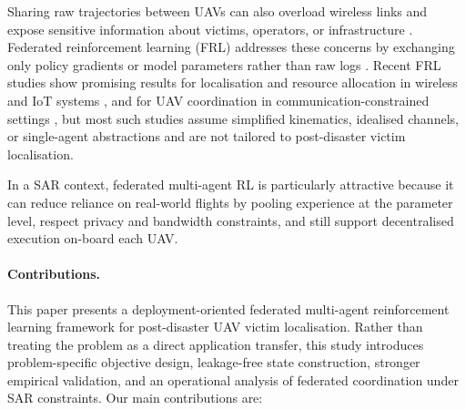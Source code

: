 \documentclass[drones,article,accept,pdftex,moreauthors]{Definitions/mdpi}
\begin{document}
Sharing raw trajectories between UAVs can also overload wireless links and expose sensitive information about victims, operators, or infrastructure
\citep{lamaaziMobileEdgeBasedCrowdSensing2020}.
Federated reinforcement learning (FRL) addresses these concerns by exchanging only policy gradients or model parameters rather than raw logs
\citep{shahbaziAgentBasedRecommendationELearning2022,wuTaskAllocationLoad2022,pintoNetoFRLIoT2023,qiFRLSurvey2022}.
Recent FRL studies show promising results for localisation and resource allocation in wireless and IoT systems
\citep{pintoNetoFRLIoT2023,ebrahimiAutonomousUAVTrajectory2020},
and for UAV coordination in communication-constrained settings
\citep{chenModelAidedFederatedReinforcement2023},
but most such studies assume simplified kinematics, idealised channels, or single-agent abstractions and are not tailored to post-disaster victim localisation.

In a SAR context, federated multi-agent RL is particularly attractive because it can reduce reliance on real-world flights by pooling experience at the parameter level, respect privacy and bandwidth constraints, and still support decentralised execution on-board each UAV.

\paragraph{Contributions.}
This paper presents a deployment-oriented federated multi-agent reinforcement learning framework for post-disaster UAV victim localisation. Rather than treating the problem as a direct application transfer, this study introduces problem-specific objective design, leakage-free state construction, stronger empirical validation, and an operational analysis of federated coordination under SAR constraints. Our main contributions are:
\end{document}
